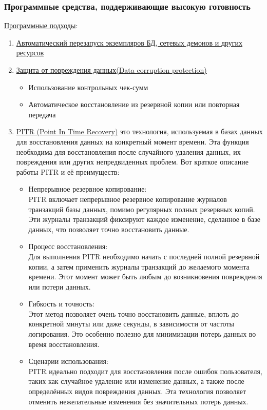 \subsubsection{Программные средства, поддерживающие высокую готовность}
\underline{Программные подходы}:
\begin{enumerate}
    \item \underline{Автоматический перезапуск экземпляров БД, сетевых демонов и других ресурсов}
    \item \underline{Защита от повреждения данных(Data corruption protection)}
    \begin{itemize}
        \item Использование контрольных чек-сумм
        \item Автоматическое восстановление из резервной копии или повторная передача
    \end{itemize}
    \item \underline{PITR (Point In Time Recovery)} это технология, используемая в базах данных для восстановления данных на конкретный момент времени. Эта функция необходима для восстановления после случайного удаления данных, их повреждения или других непредвиденных проблем. Вот краткое описание работы PITR и её преимуществ:
    \begin{itemize}
        \item Непрерывное резервное копирование: \\
        PITR включает непрерывное резервное копирование журналов транзакций базы данных, помимо регулярных полных резервных копий. Эти журналы транзакций фиксируют каждое изменение, сделанное в базе данных, что позволяет точно восстановить данные.
        \item Процесс восстановления: \\
        Для выполнения PITR необходимо начать с последней полной резервной копии, а затем применить журналы транзакций до желаемого момента времени. Этот момент может быть любым до возникновения повреждения или потери данных.
        \item Гибкость и точность: \\
        Этот метод позволяет очень точно восстановить данные, вплоть до конкретной минуты или даже секунды, в зависимости от частоты логирования. Это особенно полезно для минимизации потерь данных во время восстановления.
        \item Сценарии использования: \\
        PITR идеально подходит для восстановления после ошибок пользователя, таких как случайное удаление или изменение данных, а также после определённых видов повреждения данных. Эта технология позволяет отменить нежелательные изменения без значительных потерь данных.

\end{itemize}
\end{enumerate}
